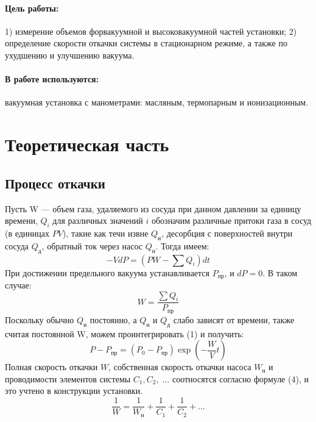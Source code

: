 \documentclass[a4paper,12pt]{article}
\begin{document}
    \paragraph{Цель работы:} 1) измерение объемов форвакуумной и высоковакуумной
    частей установки;
    2) определение скорости откачки системы в стационарном режиме,
    а также по ухудшению и улучшению вакуума.
    \paragraph{В работе используются:} вакуумная установка с манометрами: масляным,
    термопарным и ионизационным.

\section{Теоретическая часть}
    \subsection{Процесс откачки}

    Пусть W --- объем газа, удаляемого из
    сосуда при данном давлении за единицу времени, $Q_i$ для различных значений
    $i$ обозначим различные притоки газа в сосуд (в единицах $PV$), такие как
    течи извне $Q_\text{и}$, десорбция с поверхностей внутри сосуда
    $Q_\text{д}$, обратный ток через насос $Q_\text{н}$. Тогда имеем:
    \begin{equation} -VdP = \left(PW - \sum Q_i\right)dt \end{equation} При
    достижении предельного вакуума устанавливается $P_{\text{пр}}$, и $dP = 0$.
    В таком случае: \begin{equation} W = \frac{\sum Q_i}{ P_{\text{пр}}}
    \end{equation} Поскольку обычно $Q_\text{и}$ постоянно, а $Q_\text{н}$ и
    $Q_\text{д}$ слабо зависят от времени, также считая постоянной W, можем
    проинтегрировать (1) и получить: \begin{equation} P - P_{\text{пр}} = (P_0 -
    P_{\text{пр}})\exp\left(-\frac{W}{V}t\right) \label{exp} \end{equation}
    Полная скорость откачки $W$, собственная скорость откачки насоса
    $W_{\text{н}}$ и проводимости элементов системы $C_1, C_2,\;\ldots$
    соотносятся согласно формуле (4), и это учтено в конструкции установки.
    \begin{equation} \frac{1}{W} = \frac{1}{W_\text{н}} + \frac{1}{C_1} +
    \frac{1}{C_2} + \ldots \end{equation}
\end{document}
